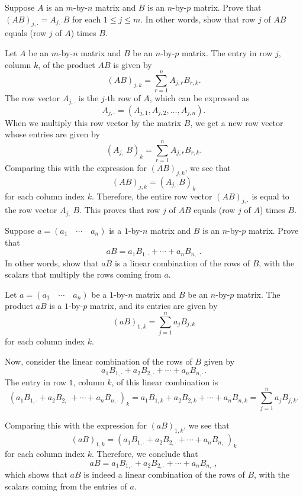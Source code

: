\begin{exercise}[3c8]
    Suppose $A$ is an $m$-by-$n$ matrix and $B$ is an $n$-by-$p$ matrix. Prove that $(AB)_{j, \cdot} = A_{j, \cdot} B$ for each $1 \leq j \leq m$. In other words, show that row $j$ of $AB$ equals (row $j$ of $A$) times $B$.
\end{exercise}

\begin{sol}
    Let $A$ be an $m$-by-$n$ matrix and $B$ be an $n$-by-$p$ matrix. The entry in row $j$, column $k$, of the product $AB$ is given by
    \[(AB)_{j, k} = \sum_{r = 1}^{n} A_{j, r} B_{r, k}.\]
    The row vector $A_{j, \cdot}$ is the $j$-th row of $A$, which can be expressed as
    \[A_{j, \cdot} = (A_{j, 1}, A_{j, 2}, \ldots, A_{j, n}).\]
    When we multiply this row vector by the matrix $B$, we get a new row vector whose entries are given by
    \[(A_{j, \cdot} B)_k = \sum_{r = 1}^{n} A_{j, r} B_{r, k}.\]
    Comparing this with the expression for $(AB)_{j, k}$, we see that
    \[(AB)_{j, k} = (A_{j, \cdot} B)_k\]
    for each column index $k$. Therefore, the entire row vector $(AB)_{j, \cdot}$ is equal to the row vector $A_{j, \cdot} B$. This proves that row $j$ of $AB$ equals (row $j$ of $A$) times $B$.
\end{sol}

\begin{exercise}[3c9]
    Suppose $a = (a_1 \quad \cdots \quad a_n)$ is a $1$-by-$n$ matrix and $B$ is an $n$-by-$p$ matrix. Prove that
    \[aB = a_1 B_{1, \cdot} + \cdots + a_n B_{n, \cdot}.\]
    In other words, show that $aB$ is a linear combination of the rows of $B$, with the scalars that multiply the rows coming from $a$.
\end{exercise}

\begin{sol}
    Let $a = (a_1 \quad \cdots \quad a_n)$ be a $1$-by-$n$ matrix and $B$ be an $n$-by-$p$ matrix. The product $aB$ is a $1$-by-$p$ matrix, and its entries are given by
    \[(aB)_{1, k} = \sum_{j = 1}^{n} a_j B_{j, k}\]
    for each column index $k$. 

    Now, consider the linear combination of the rows of $B$ given by
    \[a_1 B_{1, \cdot} + a_2 B_{2, \cdot} + \cdots + a_n B_{n, \cdot}.\]
    The entry in row $1$, column $k$, of this linear combination is
    \[(a_1 B_{1, \cdot} + a_2 B_{2, \cdot} + \cdots + a_n B_{n, \cdot})_k = a_1 B_{1, k} + a_2 B_{2, k} + \cdots + a_n B_{n, k} = \sum_{j = 1}^{n} a_j B_{j, k}.\]

    Comparing this with the expression for $(aB)_{1, k}$, we see that
    \[(aB)_{1, k} = (a_1 B_{1, \cdot} + a_2 B_{2, \cdot} + \cdots + a_n B_{n, \cdot})_k\]
    for each column index $k$. Therefore, we conclude that
    \[aB = a_1 B_{1, \cdot} + a_2 B_{2, \cdot} + \cdots + a_n B_{n, \cdot},\]
    which shows that $aB$ is indeed a linear combination of the rows of $B$, with the scalars coming from the entries of $a$.
\end{sol}

